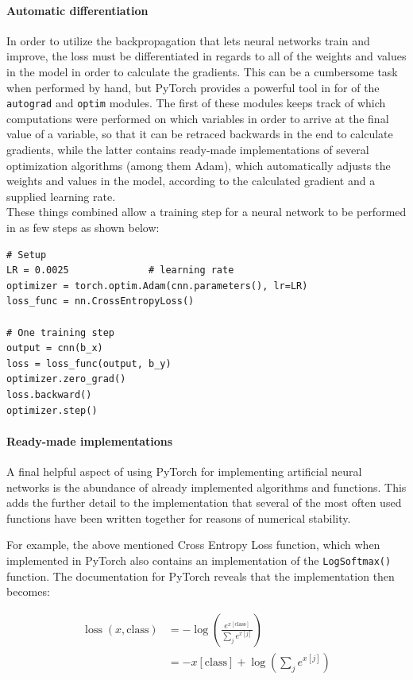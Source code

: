 \begin{multicols}{2}
\paragraph{Automatic differentiation}
In order to utilize the backpropagation that lets neural networks train and improve, the loss must be differentiated in regards to all of the weights and values in the model in order to calculate the gradients. This can be a cumbersome task when performed by hand, but PyTorch provides a powerful tool in for of the \texttt{autograd} and \texttt{optim} modules. The first of these modules keeps track of which computations were performed on which variables in order to arrive at the final value of a variable, so that it can be retraced backwards in the end to calculate gradients, while the latter contains ready-made implementations of several optimization algorithms (among them Adam), which automatically adjusts the weights and values in the model, according to the calculated gradient and a supplied learning rate.\\
These things combined allow a training step for a neural network to be performed in as few steps as shown below:
\begin{lstlisting}
# Setup
LR = 0.0025              # learning rate
optimizer = torch.optim.Adam(cnn.parameters(), lr=LR)
loss_func = nn.CrossEntropyLoss()

# One training step
output = cnn(b_x)
loss = loss_func(output, b_y)
optimizer.zero_grad()
loss.backward()
optimizer.step()
\end{lstlisting}

\paragraph{Ready-made implementations}
A final helpful aspect of using PyTorch for implementing artificial neural networks is the abundance of already implemented algorithms and functions. This adds the further detail to the implementation that several of the most often used functions have been written together for reasons of numerical stability. 

For example, the above mentioned Cross Entropy Loss function, which when implemented in PyTorch also contains an implementation of the \texttt{LogSoftmax()} function. The documentation for PyTorch reveals that the implementation then becomes:

\begin{align*}
\operatorname{loss}(x, \text {class})&=-\log \left(\frac{e^{ x[\text {class}]}}{\sum_{j} e^{ x[j]}}\right)\\
&=-x[\text {class}]+\log \left(\sum_{j} e^{x[j]}\right)
\end{align*}


\end{multicols}
